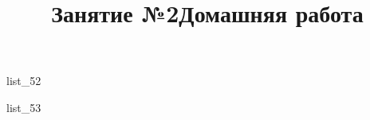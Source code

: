 \documentclass[12pt, a4paper]{article}
\begin{document}
	\title{Занятие №2}
	{list_52}
	\title{Домашняя работа}
	{list_53}
\end{document}
